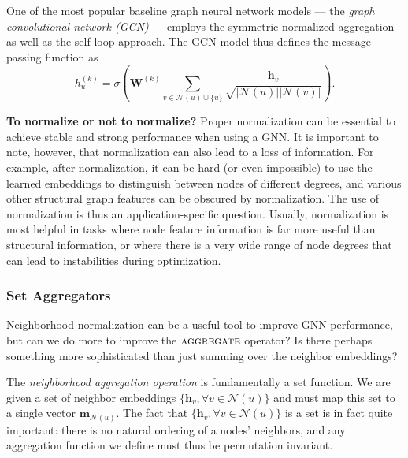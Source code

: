 \documentclass[10pt]{book}
\let\defaultmarginpar\marginpar
\renewcommand\marginpar[2][]{\defaultmarginpar{\itshape\color{gray}#2}}
\begin{document}
One of the most popular baseline graph neural network models --- the \emph{graph convolutional network (GCN)}\marginpar{graph convolutional network (GCN)} --- employs the symmetric-normalized aggregation as well as the self-loop approach. The GCN model thus defines the  message passing function as
\begin{equation}
    h^{(k)}_u = \sigma \left( \mathbf W^{(k)} \sum_{v \in \mathcal N(u) \cup \{u\}} \frac{\mathbf h_v}{\sqrt{|\mathcal N(u)| |\mathcal N(v)|}} \right).
\end{equation}

\textbf{To normalize or not to normalize?} Proper normalization can be essential to achieve stable and strong performance when using a GNN. It is important to note, however, that normalization can also lead to a loss of information. For example, after normalization, it can be hard (or even impossible) to use the learned embeddings to distinguish between nodes of different degrees, and various other structural graph features can be obscured by normalization. The use of normalization is thus an application-specific question. Usually, normalization is most helpful in tasks where node feature information is far more useful than structural information, or where there is a very wide range of node degrees that can lead to instabilities during optimization.

\subsubsection{Set Aggregators}

Neighborhood normalization can be a useful tool to improve GNN performance, but can we do more to improve the $\textsc{aggregate}$ operator? Is there perhaps something more sophisticated than just summing over the neighbor embeddings?

The \emph{neighborhood aggregation operation} is fundamentally a set function. We are given a set of neighbor embeddings $\{\mathbf h_v, \forall v \in \mathcal N(u)\}$ and must map this set to a single vector $\mathbf m_{\mathcal N(u)}$. The fact that $\{\mathbf h_v, \forall v \in \mathcal N(u)\}$ is a set is in fact quite important: there is no natural ordering of a nodes' neighbors, and any aggregation function we define must thus be permutation invariant.
\end{document}
